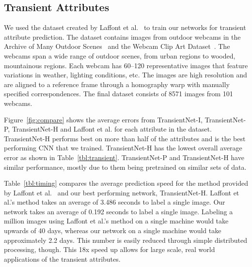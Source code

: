 \documentclass[10pt,twocolumn,letterpaper]{article}
\newcommand{\todo}[1]{\textcolor{red}{todo: {\em #1}}}
\newcommand{\figref}[1]{Figure~\ref{fig:#1}}
\newcommand{\tblref}[1]{Table~\ref{tbl:#1}}
\begin{document}
\subsection{Transient Attributes}
We used the dataset created by Laffont et al.~\cite{Laffont14} to train our
networks for transient attribute prediction. The dataset contains images from
outdoor webcams in the Archive of Many Outdoor Scenes~\cite{jacobs07amos} and
the Webcam Clip Art Dataset~\cite{lalondesig09}.  The webcams span a wide range
of outdoor scenes, from urban regions to wooded, mountainous regions. Each
webcam has 60--120 representative images that feature variations in weather,
lighting conditions, etc.  The images are high resolution and are aligned to a
reference frame through a homography warp with manually specified
correspondences.  The final dataset consists of 8571 images from 101 webcams.

\figref{compare} shows the average errors from TransientNet-I, TransientNet-P,
TransientNet-H and Laffont et al. for each attribute in the dataset.
TransientNet-H performs best on more than half of the attributes and is the
best performing CNN that we trained.  TransientNet-H has the lowest overall
average error as shown in \tblref{transient}.  TransientNet-P and
TransientNet-H have similar performance, mostly due to them being pretrained on
similar sets of data.

\tblref{timing} compares the average prediction speed for the method provided
by Laffont et al.~\cite{Laffont14} and our best performing network,
TransientNet-H.  Laffont et al.'s method takes an average of 3.486 seconds to
label a single image.  Our network takes an average of 0.192 seconds to label a
single image.  Labeling a million images using Laffont et al.'s method on a
single machine would take upwards of 40 days, whereas our network on a single
machine would take approximately 2.2 days. This number is easily reduced
through simple distributed processing, though.  This 18x speed up allows for
large scale, real world applications of the transient attributes.


%
\end{document}
